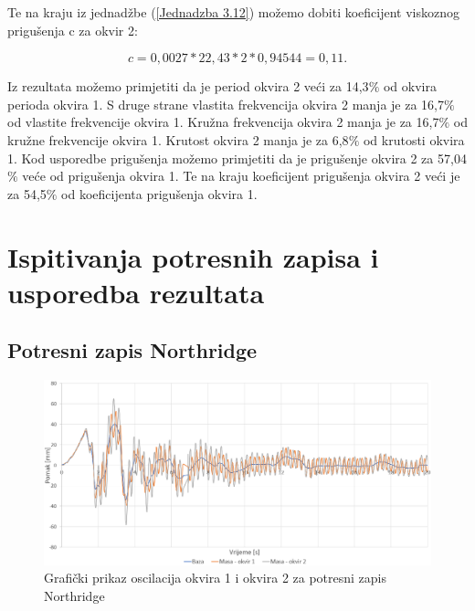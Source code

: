 \documentclass[12pt]{book}
\begin{document}
Te na kraju iz jednadžbe (\ref{Jednadzba 3.12}) možemo dobiti koeficijent viskoznog prigušenja c za okvir 2:

\begin{equation}\label{Jednadzba 5.19}
	c = 0,0027 * 22,43 * 2 * 0,94544 = 0,11.
\end{equation}

Iz rezultata možemo primjetiti da je period okvira 2 veći za 14,3$\%$ od okvira perioda okvira 1. S druge strane vlastita frekvencija okvira 2 manja je za 16,7$\%$ od vlastite frekvencije okvira 1. Kružna frekvencija okvira 2 manja je za 16,7$\%$ od kružne frekvencije okvira 1. Krutost okvira 2 manja je za 6,8$\%$ od krutosti okvira 1. Kod usporedbe prigušenja možemo primjetiti da je prigušenje okvira 2 za 57,04$\%$ veće od prigušenja okvira 1. Te na kraju koeficijent prigušenja okvira 2 veći je za 54,5$\%$ od koeficijenta prigušenja okvira 1.

\section{Ispitivanja potresnih zapisa i usporedba rezultata}

\subsection{Potresni zapis Northridge}

\begin{figure}[H]
	\centering
	\includegraphics[width=1\linewidth]{Slike/northridge_graf}
	\caption{Grafički prikaz oscilacija okvira 1 i okvira 2 za potresni zapis Northridge}
	\label{fig:northridgegraf}
\end{figure}
\end{document}
